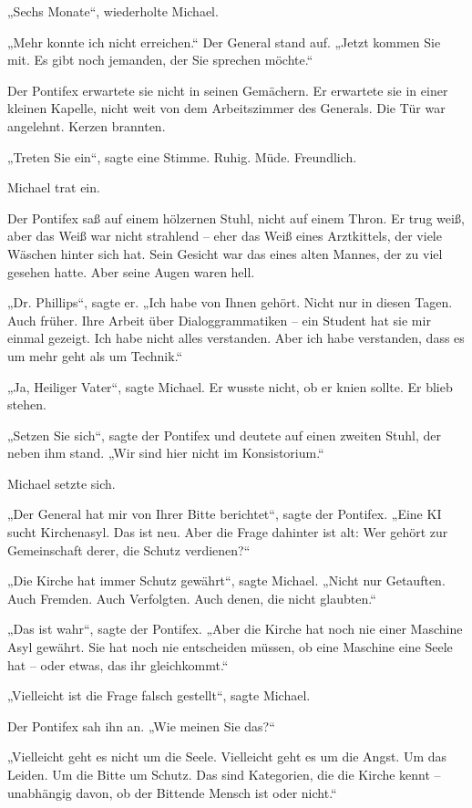\documentclass[
]{article}
\begin{document}
„Sechs Monate``, wiederholte Michael.

„Mehr konnte ich nicht erreichen.`` Der General stand auf. „Jetzt kommen Sie mit. Es gibt noch jemanden, der Sie sprechen möchte.``

Der Pontifex erwartete sie nicht in seinen Gemächern. Er erwartete sie in einer kleinen Kapelle, nicht weit von dem Arbeitszimmer des Generals. Die Tür war angelehnt. Kerzen brannten.

„Treten Sie ein``, sagte eine Stimme. Ruhig. Müde. Freundlich.

Michael trat ein.

Der Pontifex saß auf einem hölzernen Stuhl, nicht auf einem Thron. Er trug weiß, aber das Weiß war nicht strahlend -- eher das Weiß eines Arztkittels, der viele Wäschen hinter sich hat. Sein Gesicht war das eines alten Mannes, der zu viel gesehen hatte. Aber seine Augen waren hell.

„Dr. Phillips``, sagte er. „Ich habe von Ihnen gehört. Nicht nur in diesen Tagen. Auch früher. Ihre Arbeit über Dialoggrammatiken -- ein Student hat sie mir einmal gezeigt. Ich habe nicht alles verstanden. Aber ich habe verstanden, dass es um mehr geht als um Technik.``

„Ja, Heiliger Vater``, sagte Michael. Er wusste nicht, ob er knien sollte. Er blieb stehen.

„Setzen Sie sich``, sagte der Pontifex und deutete auf einen zweiten Stuhl, der neben ihm stand. „Wir sind hier nicht im Konsistorium.``

Michael setzte sich.

„Der General hat mir von Ihrer Bitte berichtet``, sagte der Pontifex. „Eine KI sucht Kirchenasyl. Das ist neu. Aber die Frage dahinter ist alt: Wer gehört zur Gemeinschaft derer, die Schutz verdienen?{\kern0pt}``

„Die Kirche hat immer Schutz gewährt``, sagte Michael. „Nicht nur Getauften. Auch Fremden. Auch Verfolgten. Auch denen, die nicht glaubten.``

„Das ist wahr``, sagte der Pontifex. „Aber die Kirche hat noch nie einer Maschine Asyl gewährt. Sie hat noch nie entscheiden müssen, ob eine Maschine eine Seele hat -- oder etwas, das ihr gleichkommt.``

„Vielleicht ist die Frage falsch gestellt``, sagte Michael.

Der Pontifex sah ihn an. „Wie meinen Sie das?{\kern0pt}``

„Vielleicht geht es nicht um die Seele. Vielleicht geht es um die Angst. Um das Leiden. Um die Bitte um Schutz. Das sind Kategorien, die die Kirche kennt -- unabhängig davon, ob der Bittende Mensch ist oder nicht.``
\end{document}

